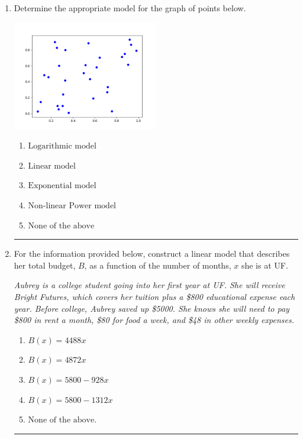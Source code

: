 \documentclass[14pt]{extbook}
\newcommand{\litem}[1]{\item#1\hspace*{-1cm}\rule{\textwidth}{0.4pt}}
\begin{document}
\begin{enumerate}
{\begin{enumerate}[label=\Alph*.]
\end{enumerate} }
\litem{
Determine the appropriate model for the graph of points below.
\begin{center}
    \includegraphics[width=0.5\textwidth]{../Figures/identifyModelGraph12CopyA.png}
\end{center}
\begin{enumerate}[label=\Alph*.]
\item \( \text{Logarithmic model} \)
\item \( \text{Linear model} \)
\item \( \text{Exponential model} \)
\item \( \text{Non-linear Power model} \)
\item \( \text{None of the above} \)

\end{enumerate} }
\litem{
For the information provided below, construct a linear model that describes her total budget, $B$, as a function of the number of months, $x$ she is at UF.
\begin{center}
    \textit{ Aubrey is a college student going into her first year at UF. She will receive Bright Futures, which covers her tuition plus a \$800 educational expense each year. Before college, Aubrey saved up \$5000. She knows she will need to pay \$800 in rent a month, \$80 for food a week, and \$48 in other weekly expenses. }
\end{center}
\begin{enumerate}[label=\Alph*.]
\item \( B(x) = 4488 x \)
\item \( B(x) = 4872 x \)
\item \( B(x) = 5800 - 928 x \)
\item \( B(x) = 5800 - 1312 x \)
\item \( \text{None of the above.} \)


\end{enumerate}}
\end{enumerate}
\end{document}
